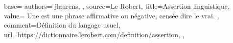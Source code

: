 {
  base={
    authors={
      jlaurens,
    },
    source=Le Robert,
    title=Assertion linguistique,
    value={
       Une  est une phrase affirmative ou négative, censée dire le vrai.
    },
    comment={Définition du langage usuel},
    url={https://dictionnaire.lerobert.com/definition/assertion},
  },
}
